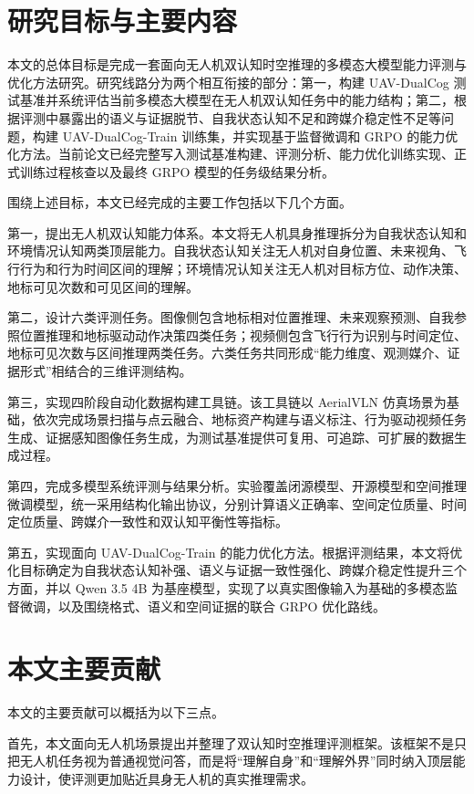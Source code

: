 \section{研究目标与主要内容}

本文的总体目标是完成一套面向无人机双认知时空推理的多模态大模型能力评测与优化方法研究。研究线路分为两个相互衔接的部分：第一，构建 UAV-DualCog 测试基准并系统评估当前多模态大模型在无人机双认知任务中的能力结构；第二，根据评测中暴露出的语义与证据脱节、自我状态认知不足和跨媒介稳定性不足等问题，构建 UAV-DualCog-Train 训练集，并实现基于监督微调和 GRPO 的能力优化方法。当前论文已经完整写入测试基准构建、评测分析、能力优化训练实现、正式训练过程核查以及最终 GRPO 模型的任务级结果分析。

围绕上述目标，本文已经完成的主要工作包括以下几个方面。

第一，提出无人机双认知能力体系。本文将无人机具身推理拆分为自我状态认知和环境情况认知两类顶层能力。自我状态认知关注无人机对自身位置、未来视角、飞行行为和行为时间区间的理解；环境情况认知关注无人机对目标方位、动作决策、地标可见次数和可见区间的理解。

第二，设计六类评测任务。图像侧包含地标相对位置推理、未来观察预测、自我参照位置推理和地标驱动动作决策四类任务；视频侧包含飞行行为识别与时间定位、地标可见次数与区间推理两类任务。六类任务共同形成“能力维度、观测媒介、证据形式”相结合的三维评测结构。

第三，实现四阶段自动化数据构建工具链。该工具链以 AerialVLN 仿真场景为基础，依次完成场景扫描与点云融合、地标资产构建与语义标注、行为驱动视频任务生成、证据感知图像任务生成，为测试基准提供可复用、可追踪、可扩展的数据生成过程。

第四，完成多模型系统评测与结果分析。实验覆盖闭源模型、开源模型和空间推理微调模型，统一采用结构化输出协议，分别计算语义正确率、空间定位质量、时间定位质量、跨媒介一致性和双认知平衡性等指标。

第五，实现面向 UAV-DualCog-Train 的能力优化方法。根据评测结果，本文将优化目标确定为自我状态认知补强、语义与证据一致性强化、跨媒介稳定性提升三个方面，并以 Qwen 3.5 4B 为基座模型，实现了以真实图像输入为基础的多模态监督微调，以及围绕格式、语义和空间证据的联合 GRPO 优化路线。

\section{本文主要贡献}

本文的主要贡献可以概括为以下三点。

首先，本文面向无人机场景提出并整理了双认知时空推理评测框架。该框架不是只把无人机任务视为普通视觉问答，而是将“理解自身”和“理解外界”同时纳入顶层能力设计，使评测更加贴近具身无人机的真实推理需求。

